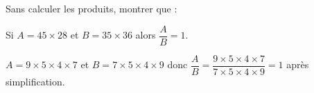 \begin{exercice*}
    Sans calculer les produits, montrer que :

    Si $A=45\times 28$ et $B=35\times 36$ alors $\dfrac{A}{B}=1$.
\end{exercice*}
\begin{corrige}

    $A=9\times 5\times 4\times 7$ et $B=7\times 5\times 4\times 9$ donc $\dfrac{A}{B}=\dfrac{9\times 5\times 4\times 7}{7\times 5\times 4\times 9} = 1$ après simplification.
\end{corrige}

